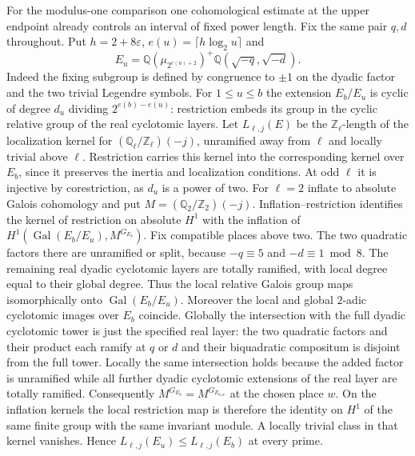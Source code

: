 \documentclass[11pt]{amsart}
\theoremstyle{definition}
\theoremstyle{remark}
\begin{document}
For the modulus-one comparison one cohomological estimate at the
upper endpoint already controls an interval of fixed power length.
Fix the same pair $q,d$ throughout. Put $h=2+8\varepsilon$,
$e(u)=\lceil h\log_2 u\rceil$ and
\[
 E_u=\mathbb Q(\mu_{2^{e(u)+2}})^+
          \mathbb Q(\sqrt{-q},\sqrt{-d}).
\]
Indeed the fixing subgroup is defined by congruence to $\pm1$ on
the dyadic factor and the two trivial Legendre symbols. For
$1\le u\le b$ the extension $E_b/E_u$ is cyclic of degree
$d_u$ dividing $2^{e(b)-e(u)}$: restriction embeds its group
in the cyclic relative group of the real cyclotomic layers.
Let $L_{\ell,j}(E)$ be the $\mathbb Z_\ell$-length of the
localization kernel for $(\mathbb Q_\ell/\mathbb Z_\ell)(-j)$,
unramified away from $\ell$ and locally trivial above $\ell$.
Restriction carries this kernel into the corresponding kernel over
$E_b$, since it preserves the inertia and localization conditions.
At odd $\ell$ it is injective by corestriction, as $d_u$ is a power
of two. For $\ell=2$ inflate to absolute Galois cohomology and put
$M=(\mathbb Q_2/\mathbb Z_2)(-j)$. Inflation--restriction identifies
the kernel of restriction on absolute $H^1$ with the inflation of
$H^1(\operatorname{Gal}(E_b/E_u),M^{G_{E_b}})$.
Fix compatible places above two. The two quadratic factors there
are unramified or split, because $-q\equiv5$ and $-d\equiv1\bmod8$.
The remaining real dyadic cyclotomic layers are totally ramified,
with local degree equal to their global degree. Thus the local
relative Galois group maps isomorphically onto
$\operatorname{Gal}(E_b/E_u)$. Moreover the local and global
$2$-adic cyclotomic images over $E_b$ coincide. Globally the
intersection with the full dyadic cyclotomic tower is just the
specified real layer: the two quadratic factors and their product
each ramify at $q$ or $d$ and their biquadratic compositum is
disjoint from the full tower. Locally the same intersection holds
because the added factor is unramified while all further dyadic
cyclotomic extensions of the real layer are totally ramified.
Consequently $M^{G_{E_b}}=M^{G_{E_{b,w}}}$ at the chosen place $w$.
On the inflation kernels the local restriction map is therefore the
identity on $H^1$ of the same finite group with the same invariant
module. A locally trivial class in that kernel vanishes. Hence
$L_{\ell,j}(E_u)\le L_{\ell,j}(E_b)$ at every prime.
\end{document}
